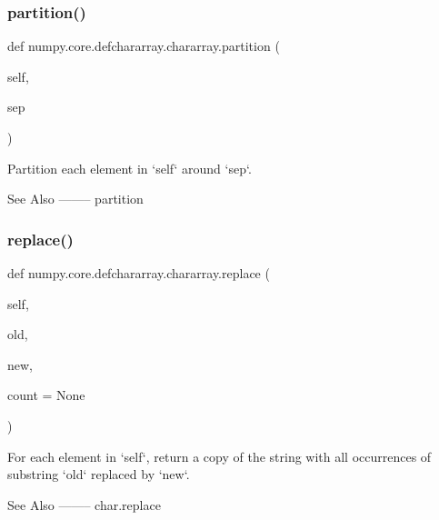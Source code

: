\subsubsection{\texorpdfstring{partition()}{partition()}}
{\footnotesize\ttfamily def numpy.\+core.\+defchararray.\+chararray.\+partition (\begin{DoxyParamCaption}\item[{}]{self,  }\item[{}]{sep }\end{DoxyParamCaption})}

\begin{DoxyVerb}Partition each element in `self` around `sep`.

See Also
--------
partition
\end{DoxyVerb}
 \mbox{\label{classnumpy_1_1core_1_1defchararray_1_1chararray_a69ff2f9e4159f0fc659ce82a94a10da8}} 
\subsubsection{\texorpdfstring{replace()}{replace()}}
{\footnotesize\ttfamily def numpy.\+core.\+defchararray.\+chararray.\+replace (\begin{DoxyParamCaption}\item[{}]{self,  }\item[{}]{old,  }\item[{}]{new,  }\item[{}]{count = {\ttfamily None} }\end{DoxyParamCaption})}

\begin{DoxyVerb}For each element in `self`, return a copy of the string with all
occurrences of substring `old` replaced by `new`.

See Also
--------
char.replace\end{DoxyVerb}
 \mbox{\label{classnumpy_1_1core_1_1defchararray_1_1chararray_afed9d14d9fbe53614c033e5548c5e63b}} 
